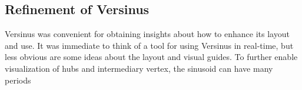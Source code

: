 																																																																																																																																																																																																																																																																																																																																																																																																															\subsection{Refinement of Versinus}\label{sec:verref}
																																																																																																																																																																																																																																																																																																																																																																																																															Versinus was convenient for obtaining insights about how to enhance its layout and use.
																																																																																																																																																																																																																																																																																																																																																																																																															It was immediate to think of a tool for using Versinus
																																																																																																																																																																																																																																																																																																																																																																																																															in real-time, but less obvious are some ideas about the layout and visual guides. 
																																																																																																																																																																																																																																																																																																																																																																																																															To further enable visualization of hubs and intermediary vertex,
																																																																																																																																																																																																																																																																																																																																																																																																															the sinusoid can have many periods 
